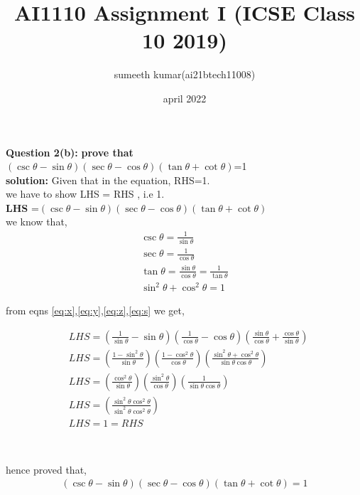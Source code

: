 \documentclass[journel,11pt,two column]{IEEEtran}
\title{AI1110 Assignment I (ICSE Class 10 2019)}
\author{sumeeth kumar(ai21btech11008)}
\date{april 2022}
\begin{document}
\maketitle
\textbf{Question 2(b):}
 \textbf{ prove that}\\
  ${(\csc \theta - \sin \theta)(\sec \theta -\cos \theta)(\tan \theta +\cot \theta)}$=1 \\  
 \textbf{solution:}   Given that in the equation, RHS=1.\\ 
 we have to show LHS = RHS , i.e 1.\\ 
 \textbf{LHS} =$(\csc \theta - \sin \theta)(\sec \theta -\cos \theta)(\tan \theta +\cot \theta)$\\
 we know that,
 \begin{align}
 \label{eq:x}
 \csc\theta=\frac{1}{\sin\theta}\\[8pt]
 \label{eq:y}
  \sec\theta = \frac{1}{\cos \theta}\\[8pt]
  \label{eq:z}
  \tan\theta = \frac{\sin\theta}{\cos\theta}=\frac{1}{\tan \theta}\\[8pt]
  \label{eq:s}
  \sin^2\theta+\cos^2\theta=1
 \end{align}
 
 \vspace{0.1cm}
 
 \begin{center}
  from eqns \eqref{eq:x},\eqref{eq:y},\eqref{eq:z},\eqref{eq:s} we get,\\[8pt]
 \end{center}
 \begin{align*}
 &{LHS=\left(\frac{1}{\sin\theta}-\sin\theta    \right)\left(\frac{1}{\cos\theta}-\cos\theta \right)\left(\frac{\sin\theta}{\cos\theta}+\frac{\cos\theta}{\sin\theta}\right)}\\[8pt]  
 &{ LHS=\left(\frac{1-\sin^2\theta}{\sin\theta}\right)\left(\frac{1-\cos^2\theta}{\cos\theta}\right)\left(\frac{\sin^2\theta+\cos^2\theta}{\sin\theta \cos\theta}\right)}\\[8pt]
 &{LHS=\left(\frac{\cos^2\theta}{\sin\theta}\right)\left(\frac{\sin^2\theta}{\cos\theta}\right)\left(\frac{1}{\sin\theta \cos\theta}\right)}\\[8pt]
 &{LHS=\left(\frac{\sin^2\theta \cos^2\theta}{\sin^2\theta \cos^2\theta}\right)}\\[8pt]
 &{LHS=1=RHS}
\end{align*}
\begin{center}
\\ [8pt]

\end{center}
 hence proved that,
\begin{align}
 {(\csc \theta - \sin \theta)(\sec \theta -\cos \theta)(\tan \theta +\cot \theta)}=1 
 \end{align}
\end{document}
